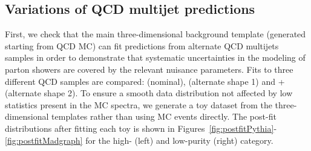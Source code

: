 \subsection{Variations of QCD multijet predictions}
First, we check that the main three-dimensional background template (generated starting from QCD  MC) can fit predictions from alternate QCD multijets samples in order to demonstrate that systematic uncertainties in the modeling of parton showers are covered by the relevant nuisance parameters. Fits to three different QCD samples are compared:  (nominal), \HERWIG{++} (alternate shape 1) and \MADGRAPH{}+ (alternate shape 2).
To ensure a smooth data distribution not affected by low statistics present in the MC spectra, we generate a toy dataset from the three-dimensional templates rather than using MC events directly. The post-fit distributions after fitting each toy is shown in Figures~\ref{fig:postfitPythia}-\ref{fig:postfitMadgraph} for the high- (left) and low-purity (right) category.
